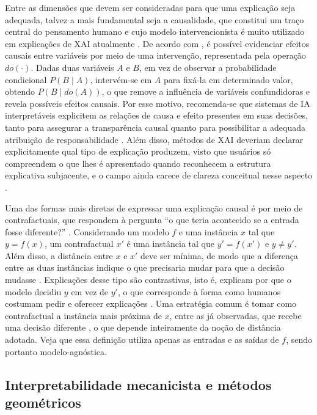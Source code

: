 Entre as dimensões que devem ser consideradas para que uma explicação seja adequada, talvez a mais fundamental seja a causalidade, que constitui um traço central do pensamento humano \citep{Bender2020} e cujo modelo intervencionista é muito utilizado em explicações de XAI atualmente \citep{Guidotti2022}. De acordo com \cite{Pearl2009}, é possível evidenciar efeitos causais entre variáveis por meio de uma intervenção, representada pela operação \(do(\cdot)\). Dadas duas variáveis \(A\) e \(B\), em vez de observar a probabilidade condicional \(P(B \mid A)\), intervém-se em \(A\) para fixá-la em determinado valor, obtendo \(P(B \mid do(A))\), o que remove a influência de variáveis confundidoras e revela possíveis efeitos causais. Por esse motivo, recomenda-se que sistemas de IA interpretáveis explicitem as relações de causa e efeito presentes em suas decisões, tanto para assegurar a transparência causal quanto para possibilitar a adequada atribuição de responsabilidade \citep{Bender2020, Baum2022}. Além disso, métodos de XAI deveriam declarar explicitamente qual tipo de explicação produzem, visto que usuários só compreendem o que lhes é apresentado quando reconhecem a estrutura explicativa subjacente, e o campo ainda carece de clareza conceitual nesse aspecto \citep{Graff2025, Mersha2024, Pawlicki2024}.

Uma das formas mais diretas de expressar uma explicação causal é por meio de contrafactuais, que respondem à pergunta ``o que teria acontecido se a entrada fosse diferente?'' \citep{Pearl2009, Wachter2018}. Considerando um modelo \(f\) e uma instância \(x\) tal que \(y = f(x)\), um contrafactual \(x'\) é uma instância tal que \(y' = f(x')\) e \(y \neq y'\). Além disso, a distância entre \(x\) e \(x'\) deve ser mínima, de modo que a diferença entre as duas instâncias indique o que precisaria mudar para que a decisão mudasse \citep{Guidotti2022}. Explicações desse tipo são contrastivas, isto é, explicam por que o modelo decidiu \(y\) em vez de \(y'\), o que corresponde à forma como humanos costumam pedir e oferecer explicações \citep{Miller2019}. Uma estratégia comum é tomar como contrafactual a instância mais próxima de \(x\), entre as já observadas, que recebe uma decisão diferente \citep{KeaneSmyth2020, Brughmans2024}, o que depende inteiramente da noção de distância adotada. Veja que essa definição utiliza apenas as entradas e as saídas de \(f\), sendo portanto modelo-agnóstica.

\subsection{Interpretabilidade mecanicista e métodos geométricos}\label{subsec:mecanicista}

